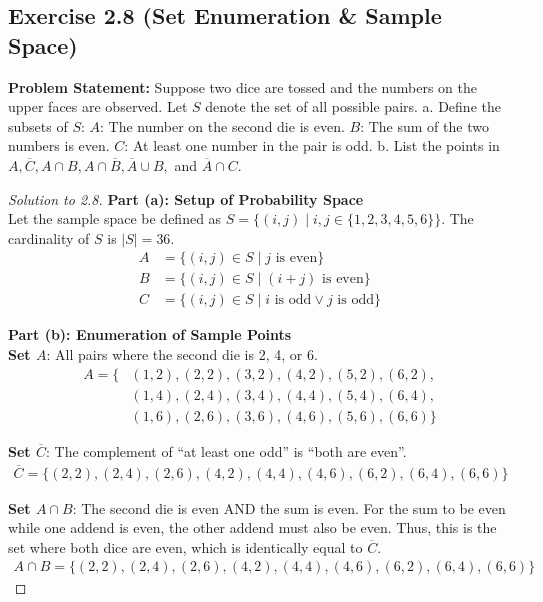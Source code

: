 \documentclass[12pt]{article}
\begin{document}
\subsection*{Exercise 2.8 (Set Enumeration \& Sample Space)}
\textbf{Problem Statement:} Suppose two dice are tossed and the numbers on the upper faces are observed. Let $S$ denote the set of all possible pairs. 
a. Define the subsets of $S$:
$A$: The number on the second die is even.
$B$: The sum of the two numbers is even.
$C$: At least one number in the pair is odd.
b. List the points in $A, \overline{C}, A \cap B, A \cap \overline{B}, \overline{A} \cup B,$ and $\overline{A} \cap C$.

\begin{proof}[Solution to 2.8]
\textbf{Part (a): Setup of Probability Space} \\
Let the sample space be defined as $S = \{ (i,j) \mid i,j \in \{1,2,3,4,5,6\} \}$. The cardinality of $S$ is $|S| = 36$.
\begin{align*}
    A &= \{ (i,j) \in S \mid j \text{ is even} \} \\
    B &= \{ (i,j) \in S \mid (i+j) \text{ is even} \} \\
    C &= \{ (i,j) \in S \mid i \text{ is odd} \lor j \text{ is odd} \}
\end{align*}

\textbf{Part (b): Enumeration of Sample Points} \\
\noindent \textbf{Set $A$}: All pairs where the second die is 2, 4, or 6. 
\begin{align*}
A = \{ &(1,2), (2,2), (3,2), (4,2), (5,2), (6,2), \\
       &(1,4), (2,4), (3,4), (4,4), (5,4), (6,4), \\
       &(1,6), (2,6), (3,6), (4,6), (5,6), (6,6) \}
\end{align*}

\noindent \textbf{Set $\overline{C}$}: The complement of ``at least one odd'' is ``both are even''.
\begin{align*}
\overline{C} = \{ (2,2), (2,4), (2,6), (4,2), (4,4), (4,6), (6,2), (6,4), (6,6) \}
\end{align*}

\noindent \textbf{Set $A \cap B$}: The second die is even AND the sum is even. For the sum to be even while one addend is even, the other addend must also be even. Thus, this is the set where both dice are even, which is identically equal to $\overline{C}$.
\begin{align*}
A \cap B = \{ (2,2), (2,4), (2,6), (4,2), (4,4), (4,6), (6,2), (6,4), (6,6) \}
\end{align*}


\end{proof}
\end{document}

